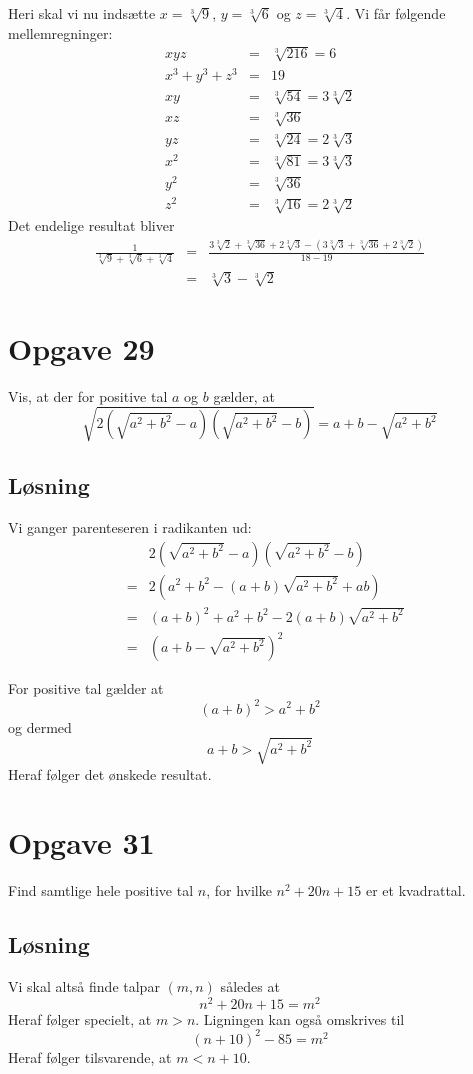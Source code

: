 \documentclass[12pt,oneside,a4paper]{article}
\newcommand{\bas}{\begin{eqnarray*}}
\newcommand{\eas}{\end{eqnarray*}}
\begin{document}
Heri skal vi nu indsætte $x=\sqrt[3]9$, $y=\sqrt[3]6$ og $z=\sqrt[3]4$. Vi får følgende mellemregninger:
\bas
xyz &=& \sqrt[3]{216} = 6\\
x^3+y^3+z^3 &=& 19 \\
xy &=& \sqrt[3]{54} = 3\sqrt[3]2 \\
xz &=& \sqrt[3]{36} \\
yz &=& \sqrt[3]{24} = 2\sqrt[3]3 \\
x^2 &=& \sqrt[3]{81} = 3\sqrt[3]3 \\
y^2 &=& \sqrt[3]{36} \\
z^2 &=& \sqrt[3]{16} = 2\sqrt[3]2
\eas
Det endelige resultat bliver
\bas
\frac{1}{\sqrt[3]9 + \sqrt[3]6 + \sqrt[3]4} 
&=& \frac{3\sqrt[3]2 + \sqrt[3]{36} + 2\sqrt[3]3 - (3\sqrt[3]3 + \sqrt[3]{36} + 2\sqrt[3]2)}{18-19} \\
&=& \sqrt[3]3 - \sqrt[3]2
\eas

\section{Opgave 29}
Vis, at der for positive tal $a$ og $b$ gælder, at
$$
\sqrt{2\left(\sqrt{a^2+b^2}-a\right)\left(\sqrt{a^2+b^2}-b\right)} = a+b-\sqrt{a^2+b^2}
$$

\subsection{Løsning}
Vi ganger parenteseren i radikanten ud:
\bas
&& 2\left(\sqrt{a^2+b^2}-a\right)\left(\sqrt{a^2+b^2}-b\right) \\
&=& 2\left(a^2+b^2-(a+b)\sqrt{a^2+b^2} + ab\right) \\
&=& (a+b)^2 + a^2 + b^2 - 2(a+b)\sqrt{a^2+b^2} \\
&=& \left(a+b - \sqrt{a^2+b^2}\right)^2
\eas

For positive tal gælder at
$$
(a+b)^2 > a^2+b^2
$$
og dermed
$$
a+b > \sqrt{a^2+b^2}
$$
Heraf følger det ønskede resultat.


\section{Opgave 31}
Find samtlige hele positive tal $n$, for hvilke $n^2+20n+15$ er et kvadrattal.

\subsection{Løsning}
Vi skal altså finde talpar $(m,n)$ således at 
$$
n^2+20n+15 = m^2
$$
Heraf følger specielt, at $m>n$.
Ligningen kan også omskrives til
$$
(n+10)^2-85 = m^2
$$
Heraf følger tilsvarende, at $m<n+10$.
\end{document}
